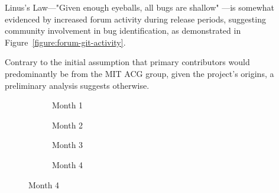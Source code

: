 \documentclass{article}
\begin{document}
Linus's Law—"Given enough eyeballs, all bugs are shallow" \parencite[29]{raymondCathedralBazaar1999}—is somewhat evidenced by increased forum activity during release periods, suggesting community involvement in bug identification, as demonstrated in Figure~\ref{figure:forum-git-activity}.



Contrary to the initial assumption that primary contributors would predominantly be from the MIT ACG group, given the project's origins, a preliminary analysis suggests otherwise.

\begin{figure}[htbp]
  \centering
  
  \begin{subfigure}[b]{0.24\textwidth}
      
      \caption{Month 1}
      \label{fig:month1}
  \end{subfigure}
  \hfill
  \begin{subfigure}[b]{0.24\textwidth}
    
      \caption{Month 2}
      \label{fig:month2}
  \end{subfigure}
  \hfill
  \begin{subfigure}[b]{0.24\textwidth}
    
      \caption{Month 3}
      \label{fig:month3}
  \end{subfigure}
  \hfill
  \begin{subfigure}[b]{0.24\textwidth}
    
      \caption{Month 4}
      \label{fig:month4}
  \end{subfigure}
  
  \vspace{0.25cm}


\end{figure}
\end{document}
